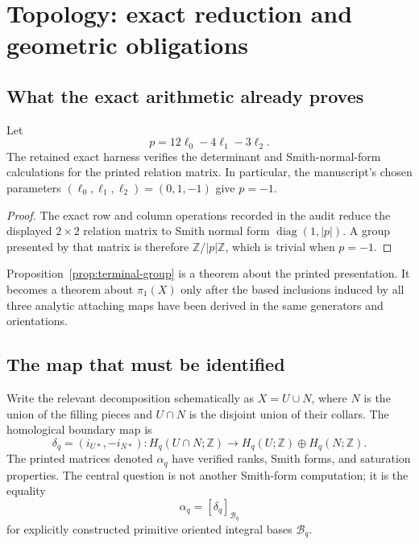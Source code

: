 \section{Topology: exact reduction and geometric obligations}

\subsection{What the exact arithmetic already proves}

Let
\[
p=12\ell_0-4\ell_1-3\ell_2.
\]
The retained exact harness verifies the determinant and Smith-normal-form calculations for the printed relation matrix. In particular, the manuscript's chosen parameters $(\ell_0,\ell_1,\ell_2)=(0,1,-1)$ give $p=-1$.


\begin{proof}
The exact row and column operations recorded in the audit reduce the displayed
$2\times2$ relation matrix to Smith normal form
$\operatorname{diag}(1,|p|)$. A group presented by that matrix is therefore
$\mathbb Z/|p|\mathbb Z$, which is trivial when $p=-1$.
\end{proof}

\begin{remark}
Proposition~\ref{prop:terminal-group} is a theorem about the printed
presentation. It becomes a theorem about $\pi_1(X)$ only after the based
inclusions induced by all three analytic attaching maps have been derived in
the same generators and orientations.
\end{remark}

\subsection{The map that must be identified}

Write the relevant decomposition schematically as $X=U\cup N$, where $N$ is the union of the filling pieces and $U\cap N$ is the disjoint union of their collars. The homological boundary map is
\[
\delta_q=(i_{U*},-i_{N*})\colon
H_q(U\cap N;\mathbb Z)\longrightarrow
H_q(U;\mathbb Z)\oplus H_q(N;\mathbb Z).
\]
The printed matrices denoted $\alpha_q$ have verified ranks, Smith forms, and saturation properties. The central question is not another Smith-form computation; it is the equality
\[
\boxed{\alpha_q=[\delta_q]_{\mathcal B_q}}
\]
for explicitly constructed primitive oriented integral bases $\mathcal B_q$.

